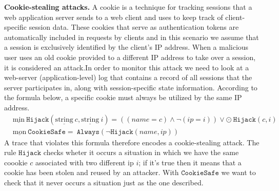 \documentclass[english]{article}
\begin{document}
\textbf{Cookie-stealing attacks.}
A cookie is a technique for tracking sessions that a web application server sends to a web client and uses to keep track of client-specific session data. These cookies that serve as authentication tokens are automatically included in requests by clients and in this scenario we assume that a session is exclusively identified by the client's IP address. When a malicious user uses an old cookie provided to a different IP address to take over a session, it is considered an attack.In order to monitor this attack we need to look at a web-server (application-level) log that contains a record of all sessions that the server participates in, along with session-specific state information.
According to the formula below, a specific cookie must always be utilized by the same IP address.
\begin{align*}
    & \underline{\text{min}}\ \mathtt{Hijack}(\underline{\text{string}}\ c,\underline{\text{string}}\ i) = ((name=c)\land\neg(ip=i))\lor\odot\ \mathtt{Hijack}(c,i) \\
    & \underline{\text{mon}}\ \mathtt{CookieSafe} =\ \mathtt{Always}(\neg\mathtt{Hijack}(name,ip)) 
\end{align*}
A trace that violates this formula therefore encodes a cookie-stealing attack. The rule $\mathtt{Hijack}$ checks wheter it occurs a situation in which we have the same coookie $c$ associated with two different ip $i$; if it's true then it means that a cookie has been stolen and reused by an attacker. With $\mathtt{CookieSafe}$ we want to check that it never occurs a situation just as the one described.
\end{document}

